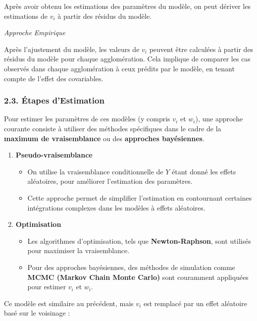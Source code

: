 \documentclass[
]{article}
\providecommand{\tightlist}{%
  \setlength{\itemsep}{0pt}\setlength{\parskip}{0pt}}
\begin{document}
Après avoir obtenu les estimations des paramètres du modèle, on peut
dériver les estimations de \(v_i\) à partir des résidus du modèle.

\emph{Approche Empirique}

Après l'ajustement du modèle, les valeurs de \(v_i\) peuvent être
calculées à partir des résidus du modèle pour chaque agglomération. Cela
implique de comparer les cas observés dans chaque agglomération à ceux
prédits par le modèle, en tenant compte de l'effet des covariables.

\subsubsection{2.3. Étapes d'Estimation}\label{uxe9tapes-destimation}

Pour estimer les paramètres de ces modèles (y compris \(v_i\) et
\(w_i\)), une approche courante consiste à utiliser des méthodes
spécifiques dans le cadre de la \textbf{maximum de vraisemblance} ou des
\textbf{approches bayésiennes}.

\begin{enumerate}
\def\labelenumi{\arabic{enumi}.}
\tightlist
\item
  \textbf{Pseudo-vraisemblance}

  \begin{itemize}
  \tightlist
  \item
    On utilise la vraisemblance conditionnelle de \(Y\) étant donné les
    effets aléatoires, pour améliorer l'estimation des paramètres.
  \item
    Cette approche permet de simplifier l'estimation en contournant
    certaines intégrations complexes dans les modèles à effets
    aléatoires.
  \end{itemize}
\item
  \textbf{Optimisation}

  \begin{itemize}
  \tightlist
  \item
    Les algorithmes d'optimisation, tels que \textbf{Newton-Raphson},
    sont utilisés pour maximiser la vraisemblance.
  \item
    Pour des approches bayésiennes, des méthodes de simulation comme
    \textbf{MCMC (Markov Chain Monte Carlo)} sont couramment appliquées
    pour estimer \(v_i\) et \(w_i\).
  \end{itemize}
\end{enumerate}

Ce modèle est similaire au précédent, mais \(v_i\) est remplacé par un
effet aléatoire basé sur le voisinage :
\end{document}
